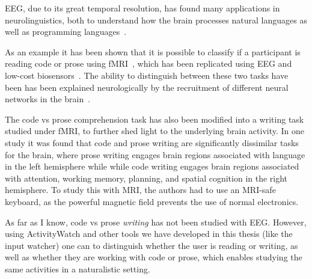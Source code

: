        EEG, due to its great temporal resolution, has found many applications in neurolinguistics, both to understand how the brain processes natural languages as well as programming languages~\cite{prat_relating_2020}.

        As an example it has been shown that it is possible to classify if a participant is reading code or prose using fMRI~\cite{floyd_decoding_2017}, which has been replicated using EEG and low-cost biosensors~\cite{fucci_replication_2019}. The ability to distinguish between these two tasks have been has been explained neurologically by the recruitment of different neural networks in the brain~\cite{ivanova_comprehension_2020}.

        The code vs prose comprehension task has also been modified into a writing task studied under fMRI, to further shed light to the underlying brain activity. In one study it was found that code and prose writing are significantly dissimilar tasks for the brain, where prose writing engages brain regions associated with language in the left hemisphere while while code writing engages brain regions associated with attention, working memory, planning, and spatial cognition in the right hemisphere\cite{noauthor_neurological_nodate}. To study this with MRI, the authors had to use an MRI-safe keyboard, as the powerful magnetic field prevents the use of normal electronics.

        As far as I know, code vs prose \emph{writing} has not been studied with EEG\@. However, using ActivityWatch and other tools we have developed in this thesis (like the input watcher) one can to distinguish whether the user is reading or writing, as well as whether they are working with code or prose, which enables studying the same activities in a naturalistic setting.





